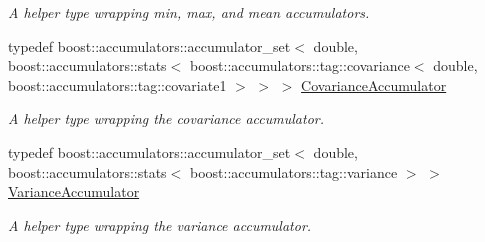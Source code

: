 \begin{DoxyCompactItemize}
\begin{DoxyCompactList}\small\item\em A helper type wrapping min, max, and mean accumulators. \end{DoxyCompactList}\item 
typedef boost\+::accumulators\+::accumulator\+\_\+set$<$ double, boost\+::accumulators\+::stats$<$ boost\+::accumulators\+::tag\+::covariance$<$ double, boost\+::accumulators\+::tag\+::covariate1 $>$ $>$ $>$ \hyperlink{namespaceAccumulators_a69e0958469bde3d2198062b52880ec68}{Covariance\+Accumulator}
\begin{DoxyCompactList}\small\item\em A helper type wrapping the covariance accumulator. \end{DoxyCompactList}\item 
typedef boost\+::accumulators\+::accumulator\+\_\+set$<$ double, boost\+::accumulators\+::stats$<$ boost\+::accumulators\+::tag\+::variance $>$ $>$ \hyperlink{namespaceAccumulators_aa858a2eb0c818655fa5d66012dd41b09}{Variance\+Accumulator}
\begin{DoxyCompactList}\small\item\em A helper type wrapping the variance accumulator. \end{DoxyCompactList}\end{DoxyCompactItemize}
